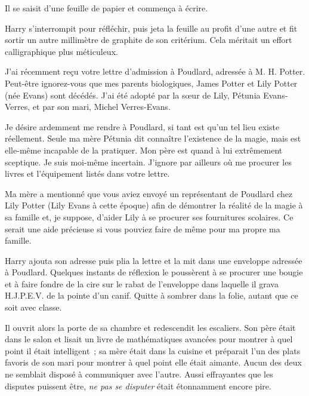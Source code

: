 Il se saisit d'une feuille de papier et commença à écrire.

\begin{writtenNote}
\end{writtenNote}

Harry s'interrompit pour réfléchir, puis jeta la feuille au profit d'une autre et fit sortir un autre millimètre de graphite de son critérium. Cela méritait un effort calligraphique plus méticuleux.

\begin{writtenNote}

J'ai récemment reçu votre lettre d'admission à Poudlard, adressée à M. H. Potter.  Peut-être ignorez-vous que mes parents biologiques, James Potter et Lily Potter (née Evans) sont décédés. J'ai été adopté par la sœur de Lily, Pétunia Evans-Verres, et par son mari, Michel Verres-Evans.

Je désire ardemment me rendre à Poudlard, si tant est qu'un tel lieu existe réellement. Seule ma mère Pétunia dit connaître l'existence de la magie, mais est elle-même incapable de la pratiquer. Mon père est quand à lui extrêmement sceptique. Je suis moi-même incertain.  J'ignore par ailleurs où me procurer les livres et l'équipement listés dans votre lettre.

Ma mère a mentionné que vous aviez envoyé un représentant de Poudlard chez Lily Potter (Lily Evans à cette époque) afin de démontrer la réalité de la magie à sa famille et, je suppose, d'aider Lily à se procurer ses fournitures scolaires. Ce serait une aide précieuse si vous pouviez faire de même pour ma propre ma famille.

\end{writtenNote}

Harry ajouta son adresse puis plia la lettre et la mit dans une enveloppe adressée à Poudlard. Quelques instants de réflexion le poussèrent à se procurer une bougie et à faire fondre de la cire sur le rabat de l'enveloppe dans laquelle il grava H.J.P.E.V.  de la pointe d'un canif. Quitte à sombrer dans la folie, autant que ce soit avec classe.

Il ouvrit alors la porte de sa chambre et redescendit les escaliers. Son père était dans le salon et lisait un livre de mathématiques avancées pour montrer à quel point il était intelligent~; sa mère était dans la cuisine et préparait l'un des plats favoris de son mari pour montrer à quel point elle était aimante. Aucun des deux ne semblait disposé à communiquer avec l'autre. Aussi effrayantes que les disputes puissent être, \emph{ne pas se disputer} était étonnamment encore pire.

